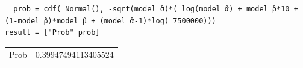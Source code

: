 \documentclass[12pt, letterpaper]{paper}
\begin{document}
\begin{verbatim}
  prob = cdf( Normal(), -sqrt(model_̂σ)*( log(model_̂α) + model_̂ρ*10 + (1-model_̂ρ)*model_̂μ + (model_̂α-1)*log( 7500000)))
result = ["Prob" prob]
\end{verbatim}

\begin{center}
\begin{tabular}{lr}
Prob & 0.39947494113405524\\
\end{tabular}
\end{center}
\end{document}
